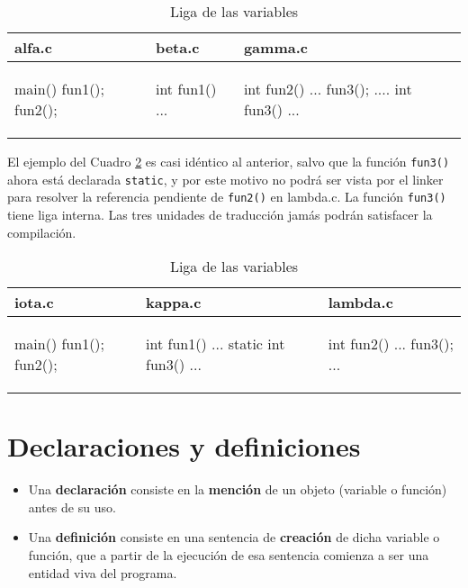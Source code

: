 \begin{ejemplo}
\begin{table}
\centering	
\begin{tabular}{l|l|l}
alfa.c & beta.c & gamma.c \\
\hline
\begin{codecell}
main()
{
	fun1();
	fun2();
}
\end{codecell}
&
\begin{codecell}
int fun1()
{
	...
}
\end{codecell}
&
\begin{codecell}
int fun2()
{
	...
	fun3();
	....
}
int fun3()
{
	...
}
\end{codecell}
\\
\end{tabular}
 \caption{Liga de las variables}
 \label{tab:ejliga} 
\end{table}
\end{ejemplo}


\begin{ejemplo}
El ejemplo del Cuadro \ref{tab:ejliga2} es casi idéntico al anterior, salvo que la función \lstinline{fun3()} ahora está declarada \lstinline{static}, y por este motivo no podrá ser vista por el linker para resolver la referencia pendiente de \lstinline{fun2()} en
lambda.c. La función \lstinline{fun3()} tiene liga interna. Las tres unidades de traducción jamás podrán satisfacer la compilación.

\begin{table}
\centering	
\begin{tabular}{l|l|l}
iota.c & kappa.c & lambda.c \\
\hline
\begin{codecell}
main()
{
	fun1();
	fun2();
}
\end{codecell}
&
\begin{codecell}
int fun1()
{
	...
}
static int fun3()
{
	...
}
\end{codecell}
&
\begin{codecell}
int fun2()
{
	...
	fun3();
	...
}
\end{codecell}
\\
\end{tabular}
 \caption{Liga de las variables}
 \label{tab:ejliga2} 
\end{table}
\end{ejemplo}


\section{Declaraciones y definiciones}
\begin{itemize}
	\item Una \textbf{declaración} consiste en la \textbf{mención} de un objeto (variable o función) antes de su uso.
	\item Una \textbf{definición} consiste en una sentencia de \textbf{creación} de dicha variable o función, que a partir de la ejecución de esa sentencia comienza a ser una entidad viva del programa.
\end{itemize}


